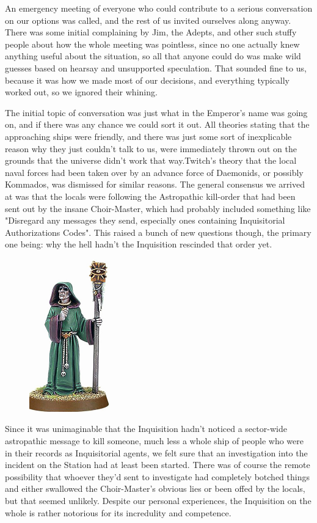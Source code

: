 An emergency meeting of everyone who could contribute to a serious conversation on our options was called, and the rest of us invited ourselves along anyway. 
There was some initial complaining by Jim, the Adepts, and other such stuffy people about how the whole meeting was pointless, since no one actually knew anything useful about the situation, so all that anyone could do was make wild guesses based on hearsay and unsupported speculation. 
That sounded fine to us, because it was how we made most of our decisions, and everything typically worked out, so we ignored their whining.

The initial topic of conversation was just what in the Emperor's name was going on, and if there was any chance we could sort it out. 
All theories stating that the approaching ships were friendly, and there was just some sort of inexplicable reason why they just couldn't talk to us, were immediately thrown out on the grounds that the universe didn't work that way.Twitch's theory that the local naval forces had been taken over by an advance force of Daemonids, or possibly Kommados, was dismissed for similar reasons. 
The general consensus we arrived at was that the locals were following the Astropathic kill-order that had been sent out by the insane Choir-Master, which had probably included something like "Disregard any messages they send, especially ones containing Inquisitorial Authorizations Codes". 
This raised a bunch of new questions though, the primary one being: 
why the hell hadn't the Inquisition rescinded that order yet.

\begin{figure}
	\begin{center}
		\includegraphics[width=\figwidth]{pics/15/26.png}
	\end{center}
\end{figure}
Since it was unimaginable that the Inquisition hadn't noticed a sector-wide astropathic message to kill someone, much less a whole ship of people who were in their records as Inquisitorial agents, we felt sure that an investigation into the incident on the Station had at least been started. 
There was of course the remote possibility that whoever they'd sent to investigate had completely botched things and either swallowed the Choir-Master's obvious lies or been offed by the locals, but that seemed unlikely. 
Despite our personal experiences, the Inquisition on the whole is rather notorious for its incredulity and competence.

